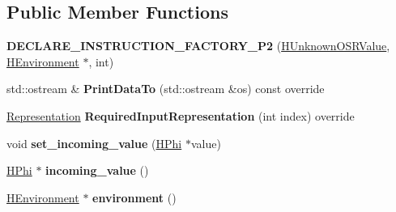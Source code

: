 \subsection*{Public Member Functions}
\begin{DoxyCompactItemize}
\item 
{\bfseries D\+E\+C\+L\+A\+R\+E\+\_\+\+I\+N\+S\+T\+R\+U\+C\+T\+I\+O\+N\+\_\+\+F\+A\+C\+T\+O\+R\+Y\+\_\+\+P2} (\hyperlink{classv8_1_1internal_1_1_h_unknown_o_s_r_value}{H\+Unknown\+O\+S\+R\+Value}, \hyperlink{classv8_1_1internal_1_1_h_environment}{H\+Environment} $\ast$, int)\hypertarget{classv8_1_1internal_1_1_h_unknown_o_s_r_value_af9690c67c15341729e4b14b04f17c8d9}{}\label{classv8_1_1internal_1_1_h_unknown_o_s_r_value_af9690c67c15341729e4b14b04f17c8d9}

\item 
std\+::ostream \& {\bfseries Print\+Data\+To} (std\+::ostream \&os) const  override\hypertarget{classv8_1_1internal_1_1_h_unknown_o_s_r_value_a1babfe16e64a0462b60ac791cbcd20a0}{}\label{classv8_1_1internal_1_1_h_unknown_o_s_r_value_a1babfe16e64a0462b60ac791cbcd20a0}

\item 
\hyperlink{classv8_1_1internal_1_1_representation}{Representation} {\bfseries Required\+Input\+Representation} (int index) override\hypertarget{classv8_1_1internal_1_1_h_unknown_o_s_r_value_a9bd671403557b40f3ee683d6b9206162}{}\label{classv8_1_1internal_1_1_h_unknown_o_s_r_value_a9bd671403557b40f3ee683d6b9206162}

\item 
void {\bfseries set\+\_\+incoming\+\_\+value} (\hyperlink{classv8_1_1internal_1_1_h_phi}{H\+Phi} $\ast$value)\hypertarget{classv8_1_1internal_1_1_h_unknown_o_s_r_value_a6959e9268ac246fc2fc77be0dbe6d6a0}{}\label{classv8_1_1internal_1_1_h_unknown_o_s_r_value_a6959e9268ac246fc2fc77be0dbe6d6a0}

\item 
\hyperlink{classv8_1_1internal_1_1_h_phi}{H\+Phi} $\ast$ {\bfseries incoming\+\_\+value} ()\hypertarget{classv8_1_1internal_1_1_h_unknown_o_s_r_value_aa5aa72fb3b1a3e72f06e242be4de3861}{}\label{classv8_1_1internal_1_1_h_unknown_o_s_r_value_aa5aa72fb3b1a3e72f06e242be4de3861}

\item 
\hyperlink{classv8_1_1internal_1_1_h_environment}{H\+Environment} $\ast$ {\bfseries environment} ()\hypertarget{classv8_1_1internal_1_1_h_unknown_o_s_r_value_aa29672a5f5f270aa99fc38482f783ad5}{}\label{classv8_1_1internal_1_1_h_unknown_o_s_r_value_aa29672a5f5f270aa99fc38482f783ad5}


\end{DoxyCompactItemize}
